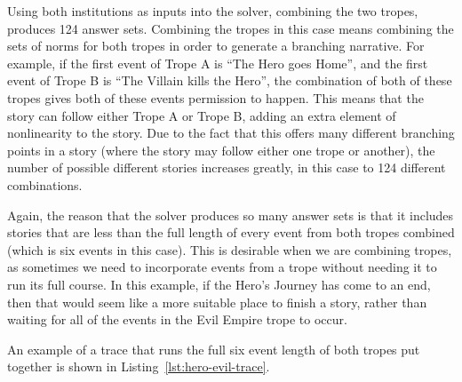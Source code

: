 \documentclass[11pt]{report}
\begin{document}
Using both institutions as inputs into the solver, combining the two tropes, produces 124 answer sets. Combining the tropes in this case means
combining the sets of norms for both tropes in order to generate a branching
narrative. For example, if the first event of Trope A is ``The Hero goes Home'',
and the first event of Trope B is ``The Villain kills the Hero'', the
combination of both of these tropes gives both of these events permission to
happen. This means that the story can follow either Trope A or Trope B, adding
an extra element of nonlinearity to the story. Due to the fact that this offers
many different branching points in a story (where the story may follow either
one trope or another), the number of possible different stories increases
greatly, in this case to 124 different combinations.

Again, the reason that the solver produces so many answer sets is that it includes stories that
are less than the full length of every event from both tropes combined (which is
six events in this case). This is desirable when we are combining tropes, as
sometimes we need to incorporate events from a trope without needing it to run
its full course. In this example, if the Hero's Journey has come to an end, then
that would seem like a more suitable place to finish a story, rather than
waiting for all of the events in the Evil Empire trope to occur.

An example of a trace that runs the full six event length of both tropes put
together is shown in Listing~\ref{lst:hero-evil-trace}.
\end{document}

